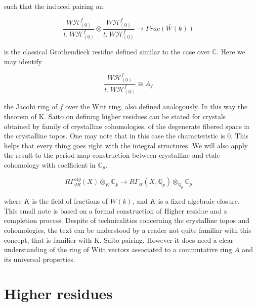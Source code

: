 \documentclass[12pt,twoside]{amsart}
\begin{document}
\vspace{0.5cm}

\noindent
such that the induced pairing on 

\[ \dfrac{W\mathcal{H}_{(0)}^f}{t.\ W\mathcal{H}_{(0)}^f} \otimes \dfrac{W\mathcal{H}_{(0)}^f}{t.\ W\mathcal{H}_{(0)}^f} \to \overline{Frac(W(k))} \]

\vspace{0.5cm}

\noindent
is the classical Grothendieck residue defined similar to the case over $\mathbb{C}$. Here we may identify 

\[ \dfrac{W\mathcal{H}_{(0)}^f}{t.\ W\mathcal{H}_{(0)}^f} \cong A_f \]

\vspace{0.5cm}

\noindent
the Jacobi ring of $f$ over the Witt ring, also defined analogously. In this way the theorem of K. Saito on defining higher residues can be stated for crystals obtained by family of crystalline cohomologies, of the degenerate fibered space in the crystalline topos. One may note that in this case the characteristic is $0$. This helps that every thing goes right with the integral structures. We will also apply the result to the period map construction between crystalline and etale cohomology with coefficient in $\mathbb{C}_p$. 

\[ R\Gamma_{dR}^{alg}(X) \otimes_{\overline{K}}\mathbb{C}_p \rightarrow R\Gamma_{et}(X,\mathbb{Q}_p) \otimes_{\mathbb{Q}_p} \mathbb{C}_p \]

\vspace{0.5cm}

\noindent 
where $K$ is the field of fractions of $W(k)$, and $\bar{K}$ is a fixed algebraic closure. 
This small note is based on a formal construction of Higher residue and a completion process. Despite of technicalities concerning the crystalline topos and cohomologies, the text can be understood by a reader not quite familiar with this concept, that is familier with K. Saito pairing. However it does need a clear understanding of the ring of Witt vectors associated to a commutative ring $A$
and its universal properties. 

\vspace{0.5cm}

\section{Higher residues}

\vspace{0.5cm}
\end{document}
